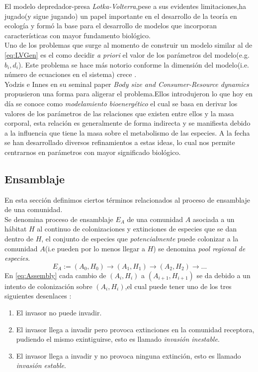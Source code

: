 El modelo depredador-presa \emph{Lotka-Volterra},pese a sus evidentes limitaciones,ha jugado(y sigue jugando) un papel importante en el desarrollo de la teor\'ia en ecolog\'ia y form\'o la base para el desarrollo de modelos que incorporan caracter\'isticas con mayor fundamento biol\'ogico. \\
Uno de los problemas que surge al momento de construir un modelo similar al de \eqref{eq:LVGen} es el como decidir \emph{a priori} el valor de los par\'ametros del modelo(e.g. $b_i , d_i$). Este problema se hace m\'as notorio conforme la dimensi\'on del modelo(i.e. n\'umero de ecuaciones en el sistema) crece \citep{yodzis1992body}.\\
Yodzis e Innes en su seminal paper \emph{Body size and Consumer-Resource dynamics}\citep{yodzis1992body} propusieron una forma para aligerar el problema.Ellos introdujeron lo que hoy en d\'ia se conoce como \emph{modelamiento bioenerg\'etico} el cual se basa en derivar los valores de los par\'ametros de las relaciones que existen entre ellos y la masa corporal, esta relaci\'on es generalmente de forma indirecta y se manifiesta debido a la influencia que tiene la masa sobre el metabolismo de las especies\citep{peters1986ecological}. A la fecha se han desarrollado diversos refinamientos a estas ideas, lo cual nos permite centrarnos en par\'ametros con mayor significado biol\'ogico.\citep{kiltie2000scaling,brown2004toward,savage2004predominance,pawar2012dimensionality,brose2010body}

\subsection{Ensamblaje}
En esta secci\'on definimos ciertos t\'erminos relacionados al proceso de ensamblaje de una comunidad. \\
Se denomina proceso de ensamblaje $E_A$ de una comunidad $A$ asociada a un h\'abitat $H$ al continuo de colonizaciones y extinciones de especies que se dan dentro de $H$, el conjunto de especies que \emph{potencialmente} puede colonizar a la comunidad $A$(i.e pueden por lo menos llegar a $H$) se denomina \emph{pool regional de especies}. 
\begin{equation}\label{eq:Assembly}
E_A := (A_0,H_0) \to (A_1,H_1) \to (A_2,H_2) \to \ldots
\end{equation}
En \eqref{eq:Assembly} cada cambio de $(A_i,H_i)$ a $(A_{i+1},H_{i+1})$ se da debido a un intento de colonizaci\'on sobre $(A_i,H_i)$,el cual puede tener uno de los tres siguientes desenlaces \citep{pawar2009community}: 
\begin{enumerate}
\item El invasor no puede invadir.
\item El invasor llega a invadir pero provoca extinciones en la comunidad receptora, pudiendo el mismo exintiguirse, esto es llamado \emph{invasi\'on inestable}.
\item El invasor llega a invadir y no provoca ninguna extinci\'on, esto es llamado \emph{invasi\'on estable}.
\end{enumerate}

